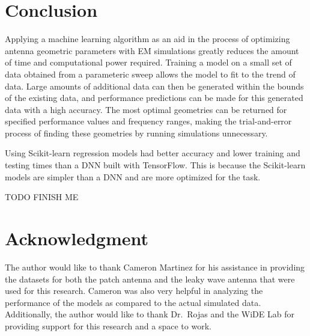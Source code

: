 \documentclass[lettersize,journal]{IEEEtran}
\begin{document}
\section{Conclusion}
Applying a machine learning algorithm as an aid in the process of optimizing antenna geometric parameters with EM simulations greatly reduces the amount of time and computational power required. Training a model on a small set of data obtained from a parameteric sweep allows the model to fit to the trend of data. Large amounts of additional data can then be generated within the bounds of the existing data, and performance predictions can be made for this generated data with a high accuracy. The most optimal geometries can be returned for specified performance values and frequency ranges, making the trial-and-error process of finding these geometries by running simulations unnecessary. 

Using Scikit-learn regression models had better accuracy and lower training and testing times than a DNN built with TensorFlow. This is because the Scikit-learn models are simpler than a DNN and are more optimized for the task.  

TODO FINISH ME 


\section*{Acknowledgment}
The author would like to thank Cameron Martinez for his assistance in providing the datasets for both the patch antenna and the leaky wave antenna that were used for this research. Cameron was also very helpful in analyzing the performance of the models as compared to the actual simulated data. Additionally, the author would like to thank Dr.~Rojas and the WiDE Lab for providing support for this research and a space to work.





\vfill
\end{document}
